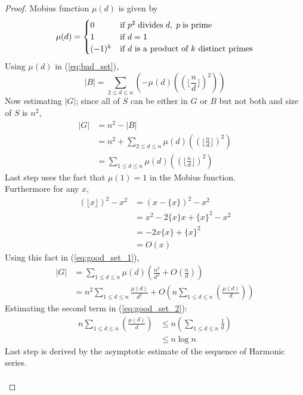 \begin{proof}
Mobius function $\mu(d)$ is given by
\[
  \mu(d) = 
  \begin{cases}
    0 &\mbox{if } p^2 \hspace{0.1cm} \text{divides} \hspace{0.1cm} d, \hspace{0.1cm} p  \hspace{0.1cm} \text{is prime}\\
    1 &\mbox{if } d = 1\\
    (-1)^k &\mbox{if } d \text{ is a product of }k \text{ distinct primes} 
  \end{cases}
\]
Using $\mu(d)$ in (\ref{eq:bad_set}),
$$|B| = \sum_{2 \le d \le n}(-\mu(d) ((\lfloor \frac{n}{d} \rfloor)^2))$$
Now estimating $|G|$; since all of $S$ can be either in $G$ or $B$ but not both and size of $S$ is $n^2$,
\begin{align}
|G| &= n^2 - |B|\nonumber \\
&= n^2 + \sum_{2 \le d \le n}\mu(d) ((\lfloor \frac{n}{d} \rfloor)^2)\nonumber \\
&= \sum_{1 \le d \le n}\mu(d) ((\lfloor \frac{n}{d} \rfloor)^2) \label{eq:good_set_1}
\end{align}
Last step uses the fact that $\mu(1) = 1$ in the Mobius function.\\
 Furthermore for any $x$,
\begin{align*}
(\lfloor x \rfloor )^2 - x^2 &= (x-\{x\})^2 - x^2\\
&= x^2 - 2\{x\}x + \{x\}^2 -x^2\\
&= -2x\{x\} + \{x\}^2\\
&= O(x)
\end{align*}
Using this fact in (\ref{eq:good_set_1}),
\begin{align}
|G| &= \sum_{1 \le d \le n}\mu(d) (\frac{n^2}{d^2} + O(\frac{n}{d}))\nonumber \\
&= n^2 \sum_{1 \le d \le n}\frac{\mu(d)}{d^2} +  O(n \sum_{1 \le d \le n}(\frac{\mu(d)}{d})) \label{eq:good_set_2}
\end{align}
Estimating the second term in (\ref{eq:good_set_2}): 
\begin{align}
n \sum_{1 \le d \le n}(\frac{\mu(d)}{d}) &\le n (\sum_{1 \le d \le n}\frac{1}{d})\nonumber \\
&\le n \log{n} \label{eq:term_2_in_good_set}
\end{align}
Last step is derived by the asymptotic estimate of the sequence of Harmonic series. \\ \\

\end{proof}
